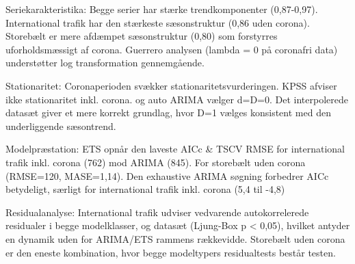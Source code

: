 \documentclass[
  danish,
]{article}
\begin{document}
\begin{table}

\caption{\label{tbl-sammenfatning}Sammenfatningsoversigt: Nøgletal per
serie og datasæt}


\end{table}%

Seriekarakteristika: Begge serier har stærke trendkomponenter
(0,87-0,97). International trafik har den stærkeste sæsonstruktur (0,86
uden corona). Storebælt er mere afdæmpet sæsonstruktur (0,80) som
forstyrres uforholdsmæssigt af corona. Guerrero analysen (lambda = 0 på
coronafri data) understøtter log transformation gennemgående.

Stationaritet: Coronaperioden svækker stationaritetsvurderingen. KPSS
afviser ikke stationaritet inkl. corona. og auto ARIMA vælger d=D=0. Det
interpolerede datasæt giver et mere korrekt grundlag, hvor D=1 vælges
konsistent med den underliggende sæsontrend.

Modelpræstation: ETS opnår den laveste AICc \& TSCV RMSE for
international trafik inkl. corona (762) mod ARIMA (845). For storebælt
uden corona (RMSE=120, MASE=1,14). Den exhaustive ARIMA søgning
forbedrer AICc betydeligt, særligt for international trafik inkl. corona
(5,4 til -4,8)

Residualanalyse: International trafik udviser vedvarende autokorrelerede
residualer i begge modelklasser, og datasæt (Ljung-Box p \textless{}
0,05), hvilket antyder en dynamik uden for ARIMA/ETS rammens rækkevidde.
Storebælt uden corona er den eneste kombination, hvor begge modeltypers
residualtests består testen.
\end{document}
